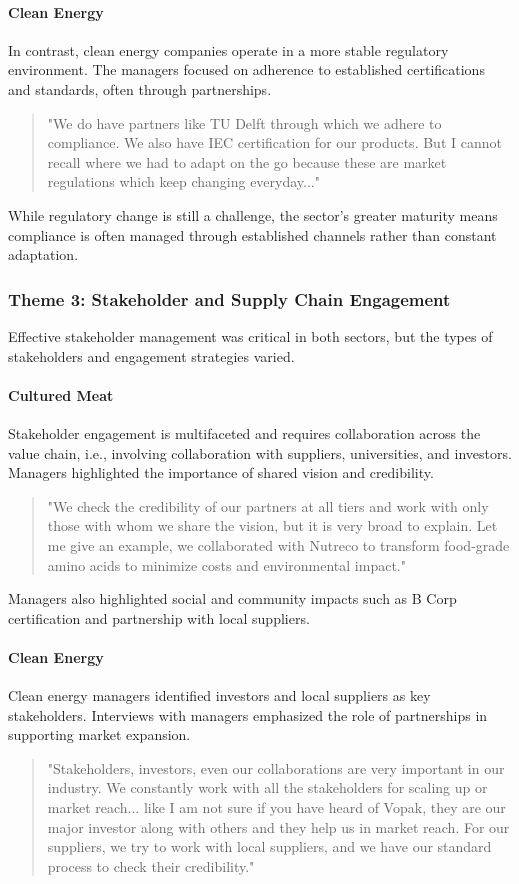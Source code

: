 \paragraph{Clean Energy}
In contrast, clean energy companies operate in a more stable regulatory environment. The managers focused on adherence to established certifications and standards, often through partnerships.
\begin{quote}
	"We do have partners like TU Delft through which we adhere to compliance. We also have IEC certification for our products. But I cannot recall where we had to adapt on the go because these are market regulations which keep changing everyday..."
\end{quote}
While regulatory change is still a challenge, the sector's greater maturity means compliance is often managed through established channels rather than constant adaptation.

\subsubsection{Theme 3: Stakeholder and Supply Chain Engagement}
Effective stakeholder management was critical in both sectors, but the types of stakeholders and engagement strategies varied.

\paragraph{Cultured Meat}
Stakeholder engagement is multifaceted and requires collaboration across the value chain, i.e., involving collaboration with suppliers, universities, and investors. Managers highlighted the importance of shared vision and credibility.
\begin{quote}
	"We check the credibility of our partners at all tiers and work with only those with whom we share the vision, but it is very broad to explain. Let me give an example, we collaborated with Nutreco to transform food-grade amino acids to minimize costs and environmental impact."
\end{quote}
Managers also highlighted social and community impacts such as B Corp certification and partnership with local suppliers.

\paragraph{Clean Energy}
Clean energy managers identified investors and local suppliers as key stakeholders. Interviews with managers emphasized the role of partnerships in supporting market expansion.
\begin{quote}
	"Stakeholders, investors, even our collaborations are very important in our industry. We constantly work with all the stakeholders for scaling up or market reach... like I am not sure if you have heard of Vopak, they are our major investor along with others and they help us in market reach. For our suppliers, we try to work with local suppliers, and we have our standard process to check their credibility."
\end{quote}

